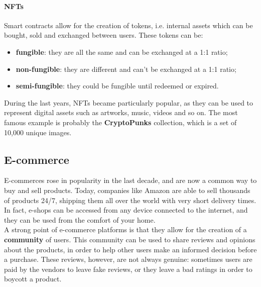 \documentclass[12pt,a4paper,oneside]{article}
\theoremstyle{definition}
\begin{document}
\paragraph{NFTs} Smart contracts allow for the creation of tokens, i.e. internal assets which can be bought, sold and exchanged between users. These tokens can be:
\begin{itemize}
  \item \textbf{fungible}: they are all the same and can be exchanged at a 1:1 ratio;
  \item \textbf{non-fungible}: they are different and can't be exchanged at a 1:1 ratio;
  \item \textbf{semi-fungible}: they could be fungible until redeemed or expired.
\end{itemize}
During the last years, NFTs became particularly popular, as they can be used to represent digital assets such as artworks, music, videos and so on. The most famous example is probably the \textbf{CryptoPunks} collection, which is a set of 10,000 unique images.\\


\subsection{E-commerce}

E-commerces rose in popularity in the last decade, and are now a common way to buy and sell products. Today, companies like Amazon are able to sell thousands of products 24/7, shipping them all over the world with very short delivery times. In fact, e-shops can be accessed from any device connected to the internet, and they can be used from the comfort of your home. \\
A strong point of e-commerce platforms is that they allow for the creation of a \textbf{community} of users. This community can be used to share reviews and opinions about the products, in order to help other users make an informed decision before a purchase. These reviews, however, are not always genuine: sometimes users are paid by the vendors to leave fake reviews, or they leave a bad ratings in order to boycott a product. \\
\end{document}
